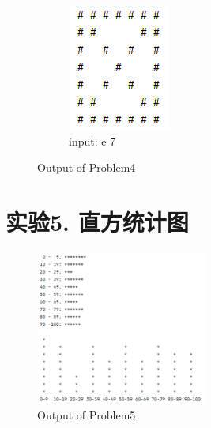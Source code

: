 \begin{figure}[H]
\begin{subfigure}{0.19\linewidth}
            \includegraphics[width=1\linewidth]{../pic/4/4.e.png}
            \caption{input: e 7}
        \end{subfigure}
        \caption{Output of Problem4}
    \end{figure}

\newpage
\section{实验5. 直方统计图}

\begin{figure}[H]
    \centering
    \includegraphics[width = 0.5\textwidth]{../pic/5/5.1.png}
    \caption{Output of Problem5}
\end{figure}

